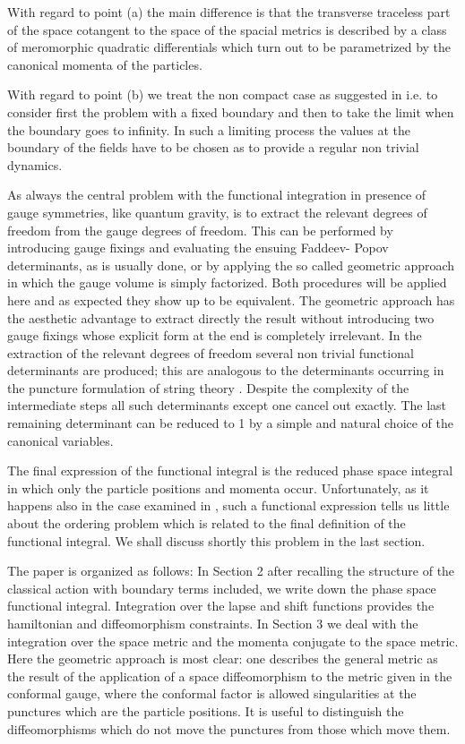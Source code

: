 \documentclass[a4paper,12pt]{article}
\begin{document}
With regard to point (a) the main difference is that the transverse
traceless part of the space cotangent to the space of the spacial
metrics is described by a class of meromorphic quadratic differentials
which turn out to be parametrized by the canonical momenta of the
particles.

With regard to point (b) we treat the non compact case as
suggested in \cite{hawkinghunter} i.e. to consider first the problem
with a fixed boundary and then to take the limit when the boundary
goes to infinity. In such a limiting process the values at the
boundary of the fields have to be chosen as to provide a regular non
trivial dynamics.

As always the central problem with the functional integration in
presence of gauge symmetries, like quantum gravity, is to extract the
relevant degrees of freedom from the gauge degrees of freedom. This
can be performed by introducing gauge fixings and evaluating the
ensuing Faddeev- Popov determinants, as is usually done, or by
applying the so called geometric approach
\cite{alvarez,polchinski,mottola} in  
which the gauge volume is simply factorized. Both procedures will be
applied here and as expected they show up to be equivalent. The
geometric approach has the aesthetic advantage to extract directly the
result without introducing two gauge fixings whose explicit form at
the end is completely irrelevant. In the extraction of the relevant
degrees of freedom several non trivial functional determinants are
produced; this are analogous to the determinants occurring in the
puncture formulation of string theory \cite{dhoker}. Despite the
complexity of the intermediate steps all such determinants except one
cancel out exactly. The last
remaining determinant can be reduced to 1 by a simple and natural
choice of the canonical variables.

The final expression of the functional integral is the reduced phase
space integral in which only the particle positions and momenta
occur. Unfortunately, as it happens also in the case examined in
\cite{carlip}, such a functional expression tells us little about
the ordering problem which is related to the final definition of the
functional integral. We shall discuss shortly this problem in the
last section.

The paper is organized as follows: In Section 2 after recalling the
structure of the classical action with boundary terms included, we
write down the phase space functional integral. Integration over the
lapse and shift functions provides the hamiltonian and diffeomorphism
constraints. In Section 3 we deal with the integration over the space
metric and the momenta conjugate to the space metric. Here the
geometric approach is most clear: one describes the general metric as
the result of the application of a space diffeomorphism to the metric
given in the conformal gauge, where the conformal factor is allowed
singularities at the punctures which are the particle positions. It
is useful to distinguish the diffeomorphisms which do not move the
punctures from those which move them.
\end{document}
